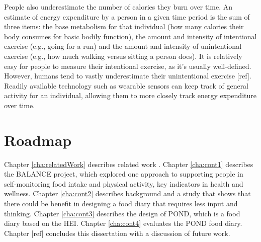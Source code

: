 People also underestimate the number of calories they burn over time. An estimate of energy expenditure by a person in a given time period is the sum of three items: the base metabolism for that individual (how many calories their body consumes for basic bodily function), the amount and intensity of intentional exercise (e.g., going for a run) and the amount and intensity of unintentional exercise (e.g., how much walking versus sitting a person does). It is relatively easy for people to measure their intentional exercise, as it's usually well-defined. However, humans tend to vastly underestimate their unintentional exercise [ref]. Readily available technology such as wearable sensors can keep track of general activity for an individual, allowing them to more closely track energy expenditure over time. 

\section{Roadmap}
Chapter \ref{cha:relatedWork} describes related work {}. Chapter \ref{cha:cont1} describes the BALANCE project, which explored one approach to supporting people in self-monitoring food intake and physical activity, key indicators in health and wellness. Chapter \ref{cha:cont2} describes background and a study that shows that there could be benefit in designing a food diary that requires less input and thinking. Chapter \ref{cha:cont3} describes the design of POND, which is a food diary based on the HEI. Chapter \ref{cha:cont4} evaluates the POND food diary. Chapter [ref] concludes this dissertation with a discussion of future work. 
